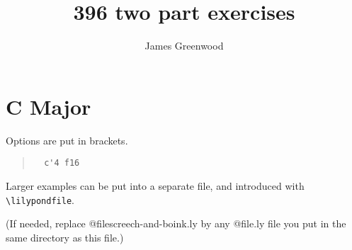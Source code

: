 \documentclass[a4paper]{article}
\title{396 two part exercises}
\author{James Greenwood}
\begin{document}
\section{C Major}

{%
\parindent 0pt
\noindent
\ifx\preLilyPondExample \undefined
\else
  \expandafter\preLilyPondExample
\fi
\def\lilypondbook{}%

\ifx\postLilyPondExample \undefined
\else
  \expandafter\postLilyPondExample
\fi
}

Options are put in brackets.

\begin{quote}
\noindent
\begin{verbatim}
  c'4 f16
\end{verbatim}
{%
\parindent 0pt
\noindent
\ifx\preLilyPondExample \undefined
\else
  \expandafter\preLilyPondExample
\fi
\def\lilypondbook{}%

\ifx\postLilyPondExample \undefined
\else
  \expandafter\postLilyPondExample
\fi
}
\end{quote}

Larger examples can be put into a separate file, and introduced with
\verb+\lilypondfile+.


(If needed, replace @file{screech-and-boink.ly} by any @file{.ly} file
you put in the same directory as this file.)
\end{document}
